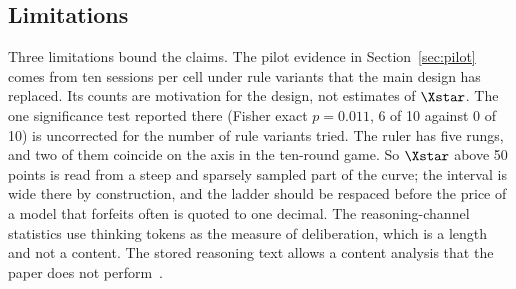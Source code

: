 \subsection{Limitations}\label{sec:limits}

Three limitations bound the claims. The pilot evidence in Section~\ref{sec:pilot} comes from ten sessions per cell under rule variants that the main design has replaced. Its counts are motivation for the design, not estimates of $\Xstar$. The one significance test reported there (Fisher exact $p = 0.011$, 6 of 10 against 0 of 10) is uncorrected for the number of rule variants tried. The ruler has five rungs, and two of them coincide on the axis in the ten-round game. So $\Xstar$ above 50 points is read from a steep and sparsely sampled part of the curve; the interval is wide there by construction, and the ladder should be respaced before the price of a model that forfeits often is quoted to one decimal. The reasoning-channel statistics use thinking tokens as the measure of deliberation, which is a length and not a content. The stored reasoning text allows a content analysis that the paper does not perform~.
